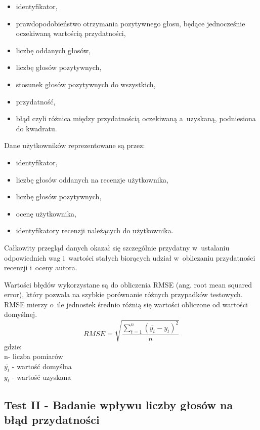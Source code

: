 \begin{itemize}
\item identyfikator,
\item prawdopodobieństwo otrzymania pozytywnego głosu, będące jednocześnie oczekiwaną wartością przydatności,
\item liczbę oddanych głosów,
\item liczbę głosów pozytywnych,
\item stosunek głosów pozytywnych do wszystkich,
\item przydatność,
\item błąd czyli różnica między przydatnością oczekiwaną a~uzyskaną, podniesiona do kwadratu.
\end{itemize}

Dane użytkowników reprezentowane są przez:

\begin{itemize}
\item identyfikator,
\item liczbę głosów oddanych na recenzje użytkownika,
\item liczbę głosów pozytywnych,
\item ocenę użytkownika,
\item identyfikatory recenzji należących do użytkownika.
\end{itemize}

Całkowity przegląd danych okazał się szczególnie przydatny w~ustalaniu odpowiednich wag i~wartości stałych biorących udział w~obliczaniu przydatności recenzji i~oceny autora.

Wartości błędów wykorzystane są do obliczenia RMSE (ang. root mean squared error), który pozwala na szybkie porównanie różnych przypadków testowych. RMSE mierzy o~ile jednostek średnio różnią się wartości obliczone od wartości domyślnej.\cite{rmseWiki}\\
\begin{equation}
RMSE=\sqrt{\frac{\sum_{t=1}^n (\bar{y_{t}}-y_{t})^2}{n}}
\end{equation}
gdzie:\\
n- liczba pomiarów\\
$\bar{y_{t}}$ - wartość domyślna\\
$y_{t}$ - wartość uzyskana\\

\subsection{Test II - Badanie wpływu liczby głosów na błąd przydatności}

